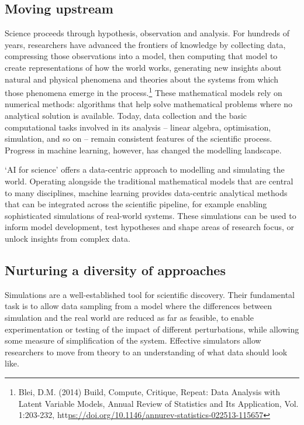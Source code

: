 \hypertarget{moving-upstream}{%
\subsection{Moving upstream}\label{moving-upstream}}

Science proceeds through hypothesis, observation and analysis. For
hundreds of years, researchers have advanced the frontiers of knowledge
by collecting data, compressing those observations into a model, then
computing that model to create representations of how the world works,
generating new insights about natural and physical phenomena and
theories about the systems from which those phenomena emerge in the
process.\footnote{Blei, D.M. (2014) Build, Compute, Critique, Repeat:
  Data Analysis with Latent Variable Models, Annual Review of Statistics
  and Its Application, Vol. 1:203-232,
  htt\uline{ps://doi.org/10.1146/annurev-statistics-022513-115657}}
These mathematical models rely on numerical methods: algorithms that
help solve mathematical problems where no analytical solution is
available. Today, data collection and the basic computational tasks
involved in its analysis -- linear algebra, optimisation, simulation,
and so on -- remain consistent features of the scientific process.
Progress in machine learning, however, has changed the modelling
landscape.

`AI for science' offers a data-centric approach to modelling and
simulating the world. Operating alongside the traditional mathematical
models that are central to many disciplines, machine learning provides
data-centric analytical methods that can be integrated across the
scientific pipeline, for example enabling sophisticated simulations of
real-world systems. These simulations can be used to inform model
development, test hypotheses and shape areas of research focus, or
unlock insights from complex data.

\hypertarget{nurturing-a-diversity-of-approaches}{%
\subsection{Nurturing a diversity of
approaches}\label{nurturing-a-diversity-of-approaches}}

Simulations are a well-established tool for scientific discovery. Their
fundamental task is to allow data sampling from a model where the
differences between simulation and the real world are reduced as far as
feasible, to enable experimentation or testing of the impact of
different perturbations, while allowing some measure of simplification
of the system. Effective simulators allow researchers to move from
theory to an understanding of what data should look like.

